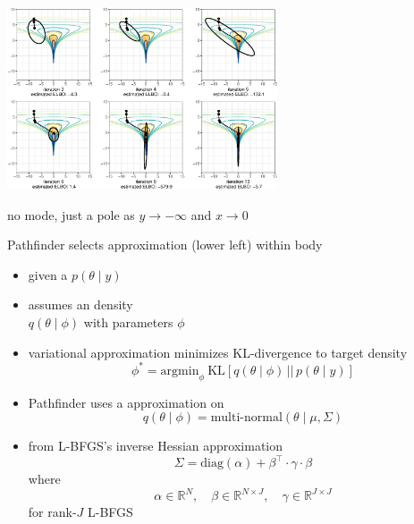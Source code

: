 \documentclass[9pt]{report}
\begin{document}
\vspace*{-6pt}
\begin{center}
\includegraphics[width=0.6\textwidth]{img/funnel_example.eps}
\end{center}
\vspace*{-6pt}
\begin{subitemize}
\item no mode, just a pole as $y \rightarrow -\infty$ and $x \rightarrow 0$
\item Pathfinder selects approximation (lower left) within body
\end{subitemize}


\begin{itemize}
\item given a  $p(\theta \mid y)$
\item {} assumes an  density
  \\ $q(\theta \mid \phi)$ with parameters $\phi$
\item variational approximation minimizes KL-divergence to target density
  \[
    \phi^*
    = \textrm{argmin}_{\phi} \
    \textrm{KL}\!\left[q(\theta \mid \phi) \,\bigg|\bigg|\, p(\theta \mid y)\right]
  \]
\end{itemize}

\begin{itemize}
\item Pathfinder uses a  approximation on 
  \[
    q(\theta \mid \phi) = \textrm{multi-normal}(\theta \mid \mu, \Sigma)
  \]
  \item {} from L-BFGS's  inverse
  Hessian approximation
  \[
    \Sigma = \textrm{diag}(\alpha) + \beta^{\top} \cdot \gamma \cdot
    \beta
  \]
  where
  \[
    \alpha \in \mathbb{R}^N, \quad
    \beta \in \mathbb{R}^{N \times J}, \quad
    \gamma \in \mathbb{R}^{J \times J}
    \]
  for rank-$J$ L-BFGS
\end{itemize}
\end{document}
